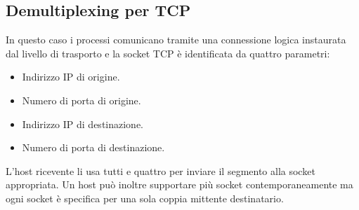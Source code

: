 \subsection{Demultiplexing per TCP}
In questo caso i processi comunicano tramite una connessione logica 
instaurata dal livello di trasporto e la socket TCP è identificata da 
quattro parametri:
\begin{itemize}
	\item Indirizzo IP di origine.
	\item Numero di porta di origine.
	\item Indirizzo IP di destinazione.
	\item Numero di porta di destinazione.
\end{itemize}
L'host ricevente li usa tutti e quattro per inviare il segmento alla 
socket appropriata. Un host può inoltre supportare più socket 
contemporaneamente ma ogni socket è specifica per una sola coppia
mittente destinatario.

